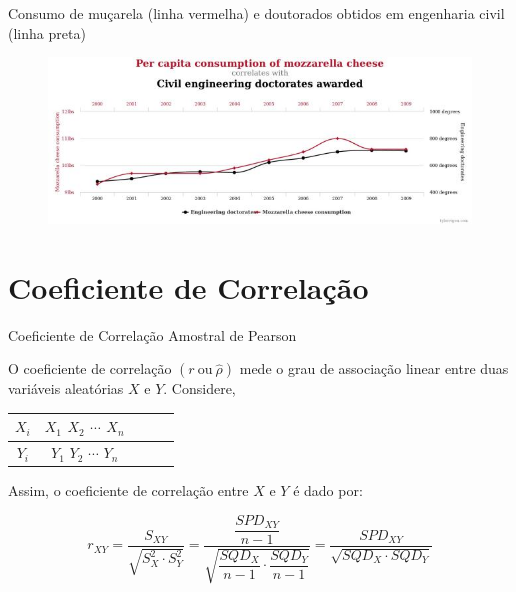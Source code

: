 \documentclass[14pt,aspectratio=1610]{beamer}
\begin{document}
\begin{frame}{}
\frametitle{ }
\begin{block}{}
\justifying
Consumo de muçarela (linha vermelha) e doutorados obtidos em engenharia civil (linha preta)
\end{block}
\begin{figure}[H]
    \centering
    \includegraphics[scale=0.5]{Figuras/Mucarela}
\end{figure}
\end{frame}

\section{Coeficiente de Correlação}
\begin{frame}{Coeficiente de Correlação Amostral de Pearson}
    \begin{block}{}
    \justifying
    O coeficiente de correlação $(r\ \textrm{ou}\ \hat{\rho})$ mede o grau de associação linear entre duas variáveis aleatórias $X$ e $Y.$ Considere,
    \begin{table}[H]
        \centering
        \begin{tabular}{c|cccc}
             $X_{i}$&$X_{1}$ $X_{2}$ $\cdots$ $X_{n}$ \\
             \hline
             $Y_{i}$&$Y_{1}$ $Y_{2}$ $\cdots$ $Y_{n}$ 
        \end{tabular}
    \end{table}
    Assim, o coeficiente de correlação entre $X$ e $Y$ é dado por:
    
    $$r_{XY}=\dfrac{S_{XY}}{\sqrt{S^{2}_{X}\cdot S_{Y}^{2}}}=
    \dfrac{\dfrac{SPD_{XY}}{n-1}}{\sqrt{\dfrac{SQD_{X}}{n-1}\cdot\dfrac{SQD_{Y}}{n-1}}}= 
    \dfrac{SPD_{XY}}{\sqrt{SQD_{X}\cdot SQD_{Y}}}$$
    
    \end{block}
\end{frame}
\end{document}
